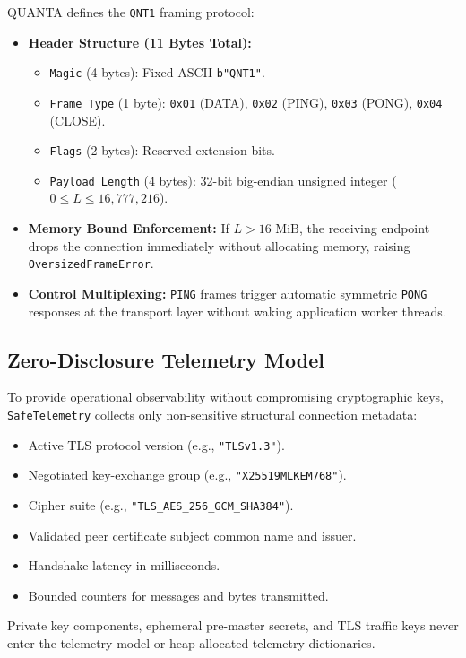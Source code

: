 \documentclass[conference]{IEEEtran}
\begin{document}
QUANTA defines the \texttt{QNT1} framing protocol:
\begin{itemize}
    \item \textbf{Header Structure (11 Bytes Total):}
    \begin{itemize}
        \item \texttt{Magic} (4 bytes): Fixed ASCII \texttt{b"QNT1"}.
        \item \texttt{Frame Type} (1 byte): \texttt{0x01} (DATA), \texttt{0x02} (PING), \texttt{0x03} (PONG), \texttt{0x04} (CLOSE).
        \item \texttt{Flags} (2 bytes): Reserved extension bits.
        \item \texttt{Payload Length} (4 bytes): 32-bit big-endian unsigned integer ($0 \le L \le 16{,}777{,}216$).
    \end{itemize}
    \item \textbf{Memory Bound Enforcement:} If $L > 16\text{~MiB}$, the receiving endpoint drops the connection immediately without allocating memory, raising \texttt{OversizedFrameError}.
    \item \textbf{Control Multiplexing:} \texttt{PING} frames trigger automatic symmetric \texttt{PONG} responses at the transport layer without waking application worker threads.
\end{itemize}

\subsection{Zero-Disclosure Telemetry Model}
To provide operational observability without compromising cryptographic keys, \texttt{SafeTelemetry} collects only non-sensitive structural connection metadata:
\begin{itemize}
    \item Active TLS protocol version (e.g., \texttt{"TLSv1.3"}).
    \item Negotiated key-exchange group (e.g., \texttt{"X25519MLKEM768"}).
    \item Cipher suite (e.g., \texttt{"TLS\_AES\_256\_GCM\_SHA384"}).
    \item Validated peer certificate subject common name and issuer.
    \item Handshake latency in milliseconds.
    \item Bounded counters for messages and bytes transmitted.
\end{itemize}
Private key components, ephemeral pre-master secrets, and TLS traffic keys never enter the telemetry model or heap-allocated telemetry dictionaries.
\end{document}
